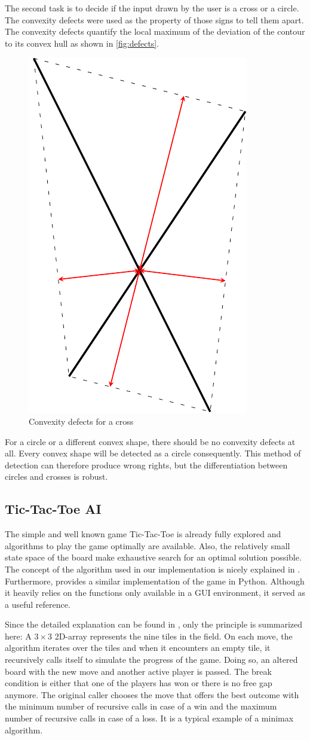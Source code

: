 \documentclass{sig-alternate-05-2015}
\begin{document}
The second task is to decide if the input drawn by the user is a cross or a circle. The convexity defects were used as the property of those signs to tell them apart. The convexity defects quantify the local maximum of the deviation of the contour to its convex hull as shown in \autoref{fig:defects}.
\begin{figure}
 	\centering
 	\includegraphics[width=.18\textwidth]{img/cnvxHullCross.pdf}
    \caption{Convexity defects for a cross}
    \label{fig:defects}
\end{figure}
For a circle or a different convex shape, there should be no convexity defects at all. Every convex shape will be detected as a circle consequently. This method of detection can therefore produce wrong rights, but the differentiation between circles and crosses is robust.

\subsection{Tic-Tac-Toe AI}
The simple and well known game Tic-Tac-Toe is already fully explored and algorithms to play the game optimally are available. Also, the relatively small state space of the board make exhaustive search for an optimal solution possible. The concept of the algorithm used in our implementation is nicely explained in \cite{NSB}.
Furthermore, \cite{vdS} provides a similar implementation of the game in Python. Although it heavily relies on the functions only available in a GUI environment, it served as a useful reference.

Since the detailed explanation can be found in \cite{NSB}, only the principle is summarized here: A $3\times 3$ 2D-array represents the nine tiles in the field. On each move, the algorithm iterates over the tiles and when it encounters an empty tile, it recursively calls itself to simulate the progress of the game. Doing so, an altered board with the new move and another active player is passed. The break condition is either that one of the players has won or there is no free gap anymore. The original caller chooses the move that offers the best outcome with the minimum number of recursive calls in case of a win and the maximum number of recursive calls in case of a loss. It is a typical example of a minimax algorithm.
\end{document}
